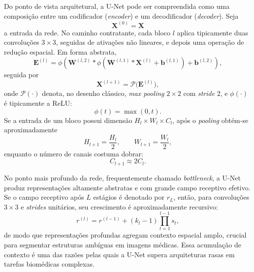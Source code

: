 \documentclass[tcc,capa]{texufpel}
\begin{document}
Do ponto de vista arquitetural, a U-Net pode ser compreendida como uma composição entre um codificador (\textit{encoder}) e um decodificador (\textit{decoder}). Seja
\begin{equation}
	\mathbf{X}^{(0)} = \mathbf{X}
\end{equation}
a entrada da rede. No caminho contratante, cada bloco \(l\) aplica tipicamente duas convoluções \(3\times3\), seguidas de ativações não lineares, e depois uma operação de redução espacial. Em forma abstrata,
\begin{equation}
	\mathbf{E}^{(l)} = \phi\!\left(\mathbf{W}^{(l,2)} * \phi\!\left(\mathbf{W}^{(l,1)} * \mathbf{X}^{(l)} + \mathbf{b}^{(l,1)}\right) + \mathbf{b}^{(l,2)}\right),
\end{equation}
seguida por
\begin{equation}
	\mathbf{X}^{(l+1)} = \mathcal{P}\big(\mathbf{E}^{(l)}\big),
\end{equation}
onde \(\mathcal{P}(\cdot)\) denota, no desenho clássico, \textit{max pooling} \(2\times2\) com \textit{stride} 2, e \(\phi(\cdot)\) é tipicamente a ReLU:
\begin{equation}
	\phi(t) = \max(0,t).
\end{equation}
Se a entrada de um bloco possui dimensão \(H_l \times W_l \times C_l\), após o \textit{pooling} obtém-se aproximadamente
\begin{equation}
	H_{l+1} = \frac{H_l}{2}, \qquad
	W_{l+1} = \frac{W_l}{2},
\end{equation}
enquanto o número de canais costuma dobrar:
\begin{equation}
	C_{l+1} \approx 2C_l.
\end{equation}

No ponto mais profundo da rede, frequentemente chamado \textit{bottleneck}, a U-Net produz representações altamente abstratas e com grande campo receptivo efetivo. Se o campo receptivo após \(L\) estágios é denotado por \(r_L\), então, para convoluções \(3\times3\) e \textit{strides} unitários, seu crescimento é aproximadamente recursivo:
\begin{equation}
	r^{(l)} = r^{(l-1)} + (k_l - 1)\prod_{t=1}^{l-1}s_t,
\end{equation}
de modo que representações profundas agregam contexto espacial amplo, crucial para segmentar estruturas ambíguas em imagens médicas. Essa acumulação de contexto é uma das razões pelas quais a U-Net supera arquiteturas rasas em tarefas biomédicas complexas. 
\end{document}

